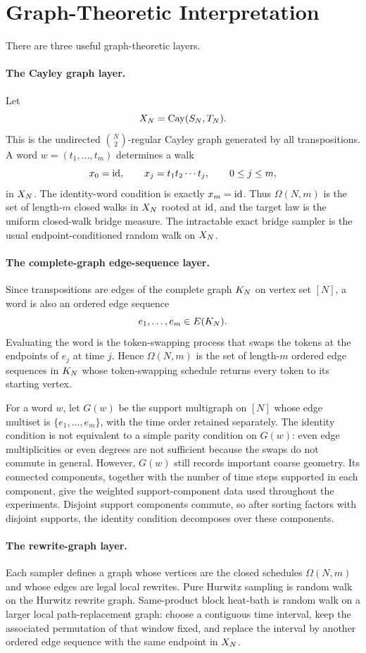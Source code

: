 \section{Graph-Theoretic Interpretation}

There are three useful graph-theoretic layers.

\paragraph{The Cayley graph layer.}
Let
\[
  X_N = \mathrm{Cay}(S_N,T_N).
\]
This is the undirected $\binom{N}{2}$-regular Cayley graph generated by all
transpositions.  A word $w=(t_1,\ldots,t_m)$ determines a walk
\[
  x_0=\mathrm{id},\qquad x_j=t_1t_2\cdots t_j,\qquad 0\le j\le m,
\]
in $X_N$.  The identity-word condition is exactly $x_m=\mathrm{id}$.  Thus
$\Omega(N,m)$ is the set of length-$m$ closed walks in $X_N$ rooted at
$\mathrm{id}$, and the target law is the uniform closed-walk bridge measure.  The
intractable exact bridge sampler is the usual endpoint-conditioned random walk
on $X_N$.

\paragraph{The complete-graph edge-sequence layer.}
Since transpositions are edges of the complete graph $K_N$ on vertex set
$[N]$, a word is also an ordered edge sequence
\[
  e_1,\ldots,e_m\in E(K_N).
\]
Evaluating the word is the token-swapping process that swaps the tokens at the
endpoints of $e_j$ at time $j$.  Hence $\Omega(N,m)$ is the set of length-$m$
ordered edge sequences in $K_N$ whose token-swapping schedule returns every
token to its starting vertex.

For a word $w$, let $G(w)$ be the support multigraph on $[N]$ whose edge
multiset is $\{e_1,\ldots,e_m\}$, with the time order retained separately.
The identity condition is not equivalent to a simple parity condition on
$G(w)$: even edge multiplicities or even degrees are not sufficient because
the swaps do not commute in general.
However, $G(w)$ still records important coarse geometry.  Its connected
components, together with the number of time steps supported in each
component, give the weighted support-component data used throughout the
experiments.  Disjoint support components commute, so after sorting factors
with disjoint supports, the identity condition decomposes over these
components.

\paragraph{The rewrite-graph layer.}
Each sampler defines a graph whose vertices are the closed schedules
$\Omega(N,m)$ and whose edges are legal local rewrites.  Pure Hurwitz
sampling is random walk on the Hurwitz rewrite graph.  Same-product
block heat-bath is random walk on a larger local path-replacement graph:
choose a contiguous time interval, keep the associated permutation of that
window fixed, and replace the interval by another ordered edge sequence with
the same endpoint in $X_N$.

